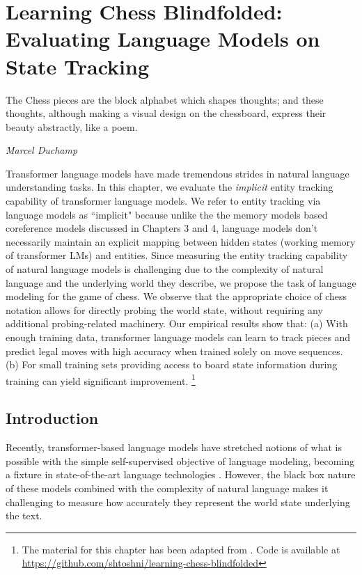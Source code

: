 \documentclass[12pt]{thesis-umich}[thesis]
\begin{document}
  
\chapter{Learning Chess Blindfolded: Evaluating Language Models on State Tracking}
\epigraph{
	\footnotesize{
		The Chess pieces are the block alphabet which shapes thoughts; and these thoughts, although making a visual design on the chessboard, express their beauty abstractly, like a poem.
}}{\textit{Marcel Duchamp}}

Transformer language models have made tremendous strides in natural language understanding tasks. 
In this chapter, we evaluate the \emph{implicit} entity tracking capability of transformer language models. 
We refer to entity tracking via language models as ``implicit" because unlike the the memory models based coreference models discussed in Chapters 3 and 4, language models don't necessarily maintain an explicit mapping between hidden states (working memory of transformer LMs) and entities. 
Since measuring the entity tracking capability of natural language models is challenging due to the complexity of natural language and the underlying world they describe, we propose the task of language modeling for the game of chess.
We observe that the appropriate choice of chess notation allows for directly probing the world state, without requiring any additional probing-related machinery. 
Our empirical results show that: (a) With enough training data, transformer language
models can learn to track pieces and predict legal moves with high accuracy when trained solely on move sequences. (b) For small training sets providing access to board state information during training can yield significant improvement. 
\footnote{The material for this chapter has been adapted from \citet{toshniwal-etal-2022-chess}. Code is available at \url{https://github.com/shtoshni/learning-chess-blindfolded}}






\section{Introduction}
Recently, transformer-based language models 
have stretched notions of what is possible with the simple self-supervised objective of language modeling, becoming a fixture in state-of-the-art language technologies
\citep{vaswani2017attention, devlin-etal-2019-bert, brown2020language}.
However, the black box nature of these models combined with the complexity of natural language makes it
challenging to measure how accurately they
represent the world state underlying the text.
\end{document}
